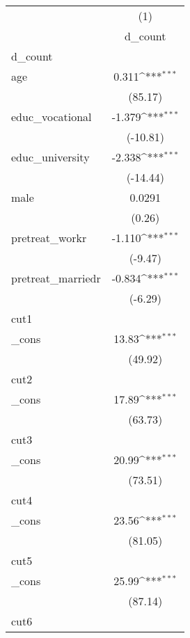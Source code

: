 {
\def\sym#1{\ifmmode^{#1}\else\(^{#1}\)\fi}
\begin{tabular}{l*{1}{c}}
\hline\hline
            &\multicolumn{1}{c}{(1)}\\
            &\multicolumn{1}{c}{d\_count}\\
\hline
d\_count     &                     \\
age         &       0.311\sym{***}\\
            &     (85.17)         \\
[1em]
educ\_vocational&      -1.379\sym{***}\\
            &    (-10.81)         \\
[1em]
educ\_university&      -2.338\sym{***}\\
            &    (-14.44)         \\
[1em]
male        &      0.0291         \\
            &      (0.26)         \\
[1em]
pretreat\_workr&      -1.110\sym{***}\\
            &     (-9.47)         \\
[1em]
pretreat\_marriedr&      -0.834\sym{***}\\
            &     (-6.29)         \\
\hline
cut1        &                     \\
\_cons      &       13.83\sym{***}\\
            &     (49.92)         \\
\hline
cut2        &                     \\
\_cons      &       17.89\sym{***}\\
            &     (63.73)         \\
\hline
cut3        &                     \\
\_cons      &       20.99\sym{***}\\
            &     (73.51)         \\
\hline
cut4        &                     \\
\_cons      &       23.56\sym{***}\\
            &     (81.05)         \\
\hline
cut5        &                     \\
\_cons      &       25.99\sym{***}\\
            &     (87.14)         \\
\hline
cut6        &                     \\

\end{tabular}}
